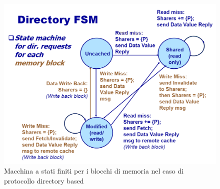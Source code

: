\begin{figure}[htb]
\centering
\includegraphics[scale=0.5]{img/directoryfsm.png}
\caption{Macchina a stati finiti per i blocchi di memoria nel caso di protocollo directory based}\label{fig:directoryfsm}
\end{figure}